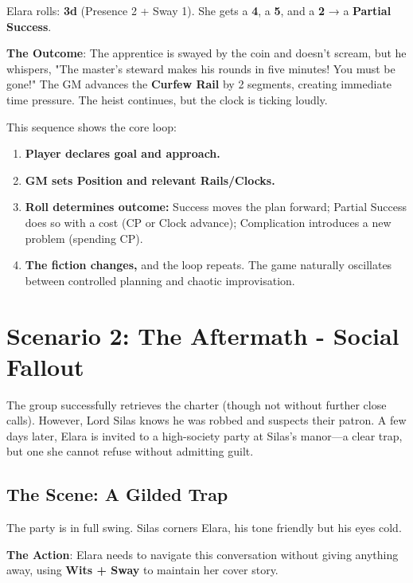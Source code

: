 Elara rolls: \textbf{3d} (Presence 2 + Sway 1). She gets a \textbf{4}, a \textbf{5}, and a \textbf{2} → a \textbf{Partial Success}.

\textbf{The Outcome}: The apprentice is swayed by the coin and doesn't scream, but he whispers, "The master's steward makes his rounds in five minutes! You must be gone!" The GM advances the \textbf{Curfew Rail} by 2 segments, creating immediate time pressure. The heist continues, but the clock is ticking loudly.

\begin{tcolorbox}[title=Heist Flow Summary, colback=blue!5!white, colframe=blue!75!black, fonttitle=\bfseries]
This sequence shows the core loop:
\begin{enumerate}
    \item \textbf{Player declares goal and approach.}
    \item \textbf{GM sets Position and relevant Rails/Clocks.}
    \item \textbf{Roll determines outcome:} Success moves the plan forward; Partial Success does so with a cost (CP or Clock advance); Complication introduces a new problem (spending CP).
    \item \textbf{The fiction changes,} and the loop repeats. The game naturally oscillates between controlled planning and chaotic improvisation.
\end{enumerate}
\end{tcolorbox}

\section*{Scenario 2: The Aftermath - Social Fallout}

The group successfully retrieves the charter (though not without further close calls). However, Lord Silas knows he was robbed and suspects their patron. A few days later, Elara is invited to a high-society party at Silas's manor—a clear trap, but one she cannot refuse without admitting guilt.

\subsection*{The Scene: A Gilded Trap}

The party is in full swing. Silas corners Elara, his tone friendly but his eyes cold.

\textbf{The Action}: Elara needs to navigate this conversation without giving anything away, using \textbf{Wits + Sway} to maintain her cover story.

